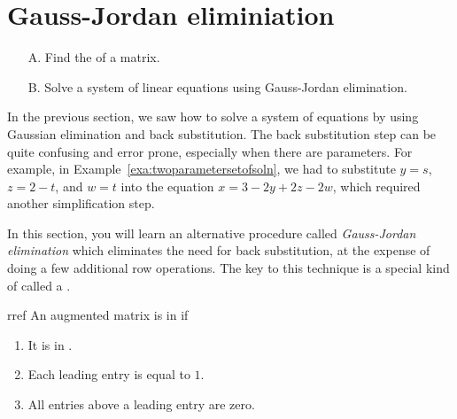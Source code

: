 \section{Gauss-Jordan eliminiation}

\begin{outcome}
  \begin{enumerate}
  \item[A.] Find the {\rref} of a matrix.
    
  \item[B.] Solve a system of linear equations using Gauss-Jordan elimination.
  \end{enumerate}
\end{outcome}

In the previous section, we saw how to solve a system of equations by
using Gaussian elimination and back substitution. The back
substitution step can be quite confusing and error prone, especially
when there are parameters. For example, in
Example~\ref{exa:twoparametersetofsoln}, we had to substitute $y=s$,
$z=2-t$, and $w=t$ into the equation $x=3-2y+2z-2w$, which required
another simplification step.

In this section, you will learn an alternative procedure called {\em
  Gauss-Jordan elimination} which eliminates the need for back
substitution, at the expense of doing a few additional row operations.
The key to this technique is a special kind of {\ef} called a
{\em {\rref}}.

\begin{definition}{\Rref}{rref}
  An augmented matrix is in \textbf{\rref}\eindex{\rref} if
  
  \begin{enumerate}
  \item It is in {\ef}.
    
  \item Each leading entry is equal to $1$.
    
  \item All entries above a leading entry are zero.
  \end{enumerate}
\end{definition}

